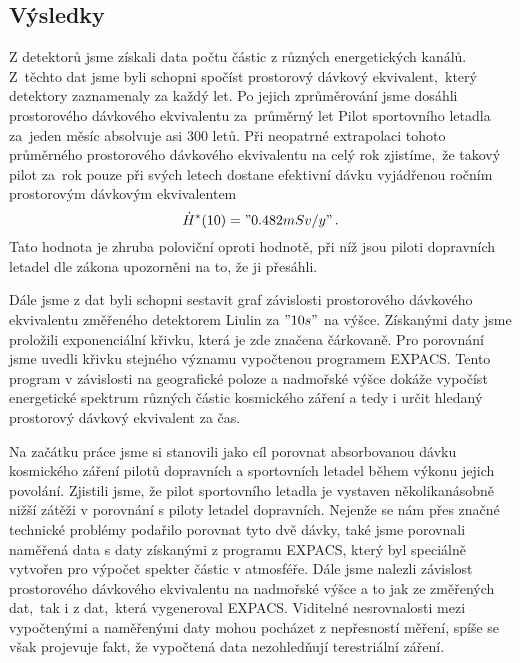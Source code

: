 \documentclass[10pt,a4paper]{article}
\begin{document}
\subsection*{Výsledky}
Z detektorů jsme získali data počtu částic z různých energetických kanálů.
Z~těchto dat jsme byli schopni spočíst prostorový dávkový ekvivalent,~který
detektory zaznamenaly za každý let. Po jejich zprůměrování jsme dosáhli
prostorového dávkového ekvivalentu za~průměrný let
Pilot sportovního letadla za~jeden měsíc absolvuje asi 300 letů. Při neopatrné
extrapolaci tohoto průměrného prostorového dávkového ekvivalentu na celý rok
zjistíme,~že takový pilot za~rok pouze při svých letech dostane efektivní dávku
vyjádřenou ročním prostorovým dávkovým ekvivalentem
$$ \dot{H}^\ast(10)="0.482 mSv/y"\,. $$
Tato hodnota je zhruba poloviční oproti hodnotě, při níž jsou piloti dopravních
letadel dle zákona upozorněni na to, že ji přesáhli.\par
Dále jsme z dat byli schopni sestavit graf závislosti prostorového dávkového
ekvivalentu změřeného detektorem Liulin za $"10 s"$ na výšce. Získanými daty
jsme proložili exponenciální křivku, která je zde značena čárkovaně. Pro
porovnání jsme uvedli křivku stejného významu vypočtenou programem EXPACS.
Tento program v závislosti na geografické poloze a nadmořské výšce dokáže
vypočíst energetické spektrum různých částic kosmického záření a tedy i určit
hledaný prostorový dávkový ekvivalent za čas.

\begin{center}
\end{center}
Na začátku práce jsme si stanovili jako cíl porovnat absorbovanou dávku
kosmického záření pilotů dopravních a sportovních letadel během výkonu jejich
povolání. Zjistili jsme, že pilot sportovního letadla je vystaven
několikanásobně nižší zátěži v porovnání s piloty letadel dopravních. Nejenže se
nám přes značné technické problémy podařilo porovnat tyto dvě dávky, také jsme
porovnali naměřená data s daty získanými z programu EXPACS, který byl speciálně
vytvořen pro výpočet spekter částic v atmosféře. Dále jsme nalezli závislost
prostorového dávkového ekvivalentu na nadmořské výšce a to jak ze změřených
dat,~tak i z dat,~která vygeneroval EXPACS. Viditelné nesrovnalosti mezi
vypočtenými a naměřenými daty mohou pocházet z nepřesností měření, spíše se
však projevuje fakt, že vypočtená data nezohledňují terestriální záření.\newpage
\end{document}
